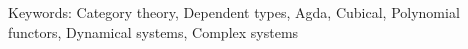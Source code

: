 













\vfill
Keywords: Category theory, Dependent types, Agda, Cubical, Polynomial functors, Dynamical systems, Complex systems

\newpage				%
\thispagestyle{empty}
\mbox{}